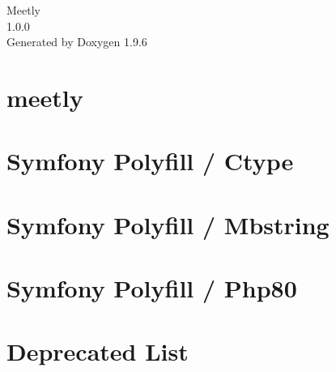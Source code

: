 \documentclass[twoside]{book}
\newcommand{\+}{\discretionary{\mbox{\scriptsize$\hookleftarrow$}}{}{}}
\newcommand{\clearemptydoublepage}{%
    \newpage{\pagestyle{empty}\cleardoublepage}%
  }
\begin{document}
  \raggedbottom
    \hypersetup{pageanchor=false,
                bookmarksnumbered=true,
                pdfencoding=unicode
               }
  \begin{titlepage}
  \vspace*{7cm}
  \begin{center}%
  {\Large Meetly}\\
  [1ex]\large 1.\+0.\+0 \\
  \vspace*{1cm}
  {\large Generated by Doxygen 1.9.6}\\
  \end{center}
  \end{titlepage}
  \clearemptydoublepage
  \tableofcontents
  \clearemptydoublepage
  \hypersetup{pageanchor=true}
\chapter{meetly}
\label{md__r_e_a_d_m_e}

\chapter{Symfony Polyfill / Ctype}
\label{md_vendor_symfony_polyfill_ctype__r_e_a_d_m_e}

\chapter{Symfony Polyfill / Mbstring}
\label{md_vendor_symfony_polyfill_mbstring__r_e_a_d_m_e}

\chapter{Symfony Polyfill / Php80}
\label{md_vendor_symfony_polyfill_php80__r_e_a_d_m_e}

\chapter{Deprecated List}
\label{deprecated}

\end{document}

